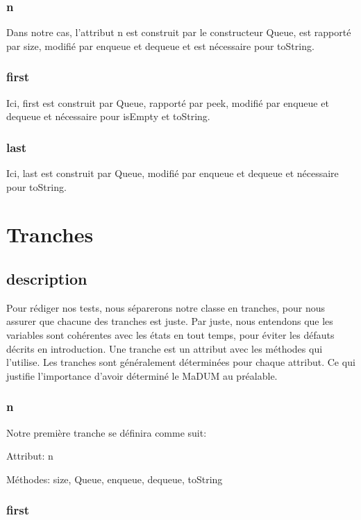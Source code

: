 \documentclass[11pt]{article}
\begin{document}
\subsubsection{n}

Dans notre cas, l'attribut n est construit par le constructeur Queue, est rapporté par size, modifié par enqueue et dequeue et est nécessaire pour toString.

\subsubsection{first}

Ici, first est construit par Queue, rapporté par peek, modifié par enqueue et dequeue et nécessaire pour isEmpty et toString.

\subsubsection{last}

Ici, last est construit par Queue, modifié par enqueue et dequeue et nécessaire pour toString.

\section{Tranches}

\subsection{description}

Pour rédiger nos tests, nous séparerons notre classe en tranches, pour nous assurer que chacune des tranches est juste.
Par juste, nous entendons que les variables sont cohérentes avec les états en tout temps, pour éviter les défauts décrits en introduction.
Une tranche est un attribut avec les méthodes qui l'utilise.
Les tranches sont généralement déterminées pour chaque attribut. Ce qui justifie l'importance d'avoir déterminé le MaDUM au préalable.

\subsubsection{n}

Notre première tranche se définira comme suit:

Attribut: n

Méthodes: size, Queue, enqueue, dequeue, toString

\subsubsection{first}
\end{document}
